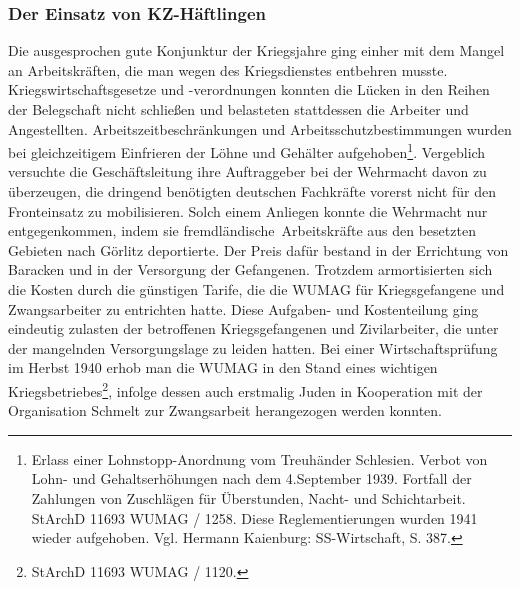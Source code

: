 \subsubsection{Der Einsatz von KZ-Häftlingen}
Die ausgesprochen gute Konjunktur der Kriegsjahre ging einher mit dem Mangel an Arbeitskräften, die man wegen des Kriegsdienstes entbehren musste. Kriegswirtschaftsgesetze und \mbox{-verordnungen} konnten die Lücken in den Reihen der Belegschaft nicht schließen und belasteten stattdessen die Arbeiter und Angestellten. Arbeitszeitbeschränkungen und Arbeitsschutzbestimmungen wurden bei gleichzeitigem Einfrieren der Löhne und Gehälter aufgehoben\footnote{Erlass einer Lohnstopp-Anordnung vom Treuhänder Schlesien. Verbot von Lohn- und Gehaltserhöhungen nach dem 4.September 1939. Fortfall der Zahlungen von Zuschlägen für Überstunden, Nacht- und Schichtarbeit. StArchD 11693 WUMAG / 1258. Diese Reglementierungen wurden 1941 wieder aufgehoben. Vgl. Hermann Kaienburg: SS-Wirtschaft, S. 387.}. Vergeblich versuchte die Geschäftsleitung ihre Auftraggeber bei der Wehrmacht davon zu überzeugen, die dringend benötigten deutschen Fachkräfte vorerst nicht für den Fronteinsatz zu mobilisieren. Solch einem Anliegen konnte die Wehrmacht nur entgegenkommen, indem sie \glqq fremdländische\grqq~Arbeitskräfte aus den besetzten Gebieten nach Görlitz deportierte. Der Preis dafür bestand in der Errichtung von Baracken und in der Versorgung der Gefangenen. Trotzdem armortisierten sich die Kosten durch die günstigen Tarife, die die WUMAG für Kriegsgefangene und Zwangsarbeiter zu entrichten hatte. Diese Aufgaben- und Kostenteilung ging eindeutig zulasten der betroffenen Kriegsgefangenen und Zivilarbeiter, die unter der mangelnden Versorgungslage zu leiden hatten.
\newline
Bei einer Wirtschaftsprüfung im Herbst 1940 erhob man die WUMAG in den Stand eines wichtigen Kriegsbetriebes\footnote{StArchD 11693 WUMAG / 1120.}, infolge dessen auch erstmalig Juden in Kooperation mit der Organisation Schmelt zur Zwangsarbeit herangezogen werden konnten.
